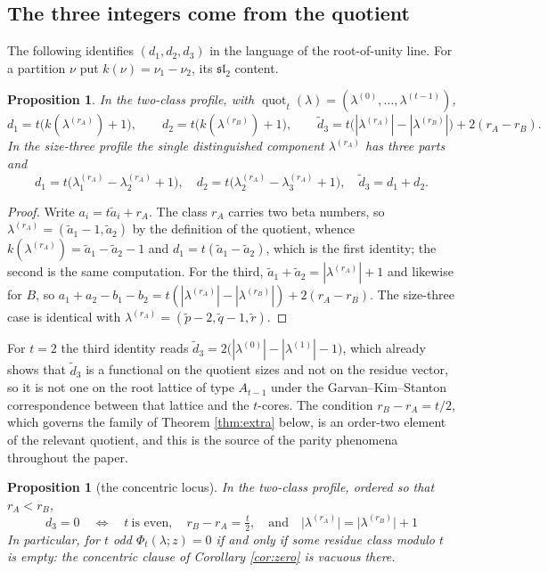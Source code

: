 \documentclass[11pt,reqno]{amsart}
\theoremstyle{plain}
\newtheorem{proposition}[theorem]{Proposition}
\theoremstyle{definition}
\newcommand{\quot}{\operatorname{quot}}
\begin{document}
\subsection{The three integers come from the quotient}
The following identifies $(d_1,d_2,d_3)$ in the language of the root-of-unity line. For a partition
$\nu$ put $k(\nu)=\nu_1-\nu_2$, its $\mathfrak{sl}_2$ content.

\begin{proposition}\label{prop:quotient}
In the two-class profile, with $\quot_t(\lambda)=(\lambda^{(0)},\dots,\lambda^{(t-1)})$,
\[
d_1=t\bigl(k(\lambda^{(r_A)})+1\bigr),\qquad
d_2=t\bigl(k(\lambda^{(r_B)})+1\bigr),\qquad
\tilde d_3=t\bigl(|\lambda^{(r_A)}|-|\lambda^{(r_B)}|\bigr)+2(r_A-r_B) .
\]
In the size-three profile the single distinguished component $\lambda^{(r_A)}$ has three parts and
\[
d_1=t\bigl(\lambda^{(r_A)}_1-\lambda^{(r_A)}_2+1\bigr),\quad
d_2=t\bigl(\lambda^{(r_A)}_2-\lambda^{(r_A)}_3+1\bigr),\quad \tilde d_3=d_1+d_2 .
\]
\end{proposition}

\begin{proof}
Write $a_i=t\tilde a_i+r_A$. The class $r_A$ carries two beta numbers, so
$\lambda^{(r_A)}=(\tilde a_1-1,\tilde a_2)$ by the definition of the quotient, whence
$k(\lambda^{(r_A)})=\tilde a_1-\tilde a_2-1$ and $d_1=t(\tilde a_1-\tilde a_2)$, which is the first
identity; the second is the same computation. For the third,
$\tilde a_1+\tilde a_2=|\lambda^{(r_A)}|+1$ and likewise for $B$, so
$a_1+a_2-b_1-b_2=t(|\lambda^{(r_A)}|-|\lambda^{(r_B)}|)+2(r_A-r_B)$. The size-three case is
identical with $\lambda^{(r_A)}=(\tilde p-2,\tilde q-1,\tilde r)$.
\end{proof}

For $t=2$ the third identity reads $\tilde d_3=2\bigl(|\lambda^{(0)}|-|\lambda^{(1)}|-1\bigr)$, which
already shows that $\tilde d_3$ is a functional on the quotient sizes and not on the residue vector, so it
is not one on the root lattice of type $A_{t-1}$ under the Garvan--Kim--Stanton correspondence
\cite{GKS90} between that lattice and the $t$-cores. The condition $r_B-r_A=t/2$, which
governs the family of Theorem \ref{thm:extra} below, is an order-two element of the relevant
quotient, and this is the source of the parity phenomena throughout the paper.

\begin{proposition}[the concentric locus]\label{rem:lattice}
In the two-class profile, ordered so that $r_A<r_B$,
\[
\boxed{\;\;d_3=0\quad\Longleftrightarrow\quad t\ \text{is even},\quad r_B-r_A=\tfrac t2,
\quad\text{and}\quad \bigl|\lambda^{(r_A)}\bigr|=\bigl|\lambda^{(r_B)}\bigr|+1\;\;}
\]
In particular, for $t$ odd $\Phi_t(\lambda;z)=0$ if and only if some residue class modulo $t$ is
empty: the concentric clause of Corollary \ref{cor:zero} is vacuous there.
\end{proposition}
\end{document}
